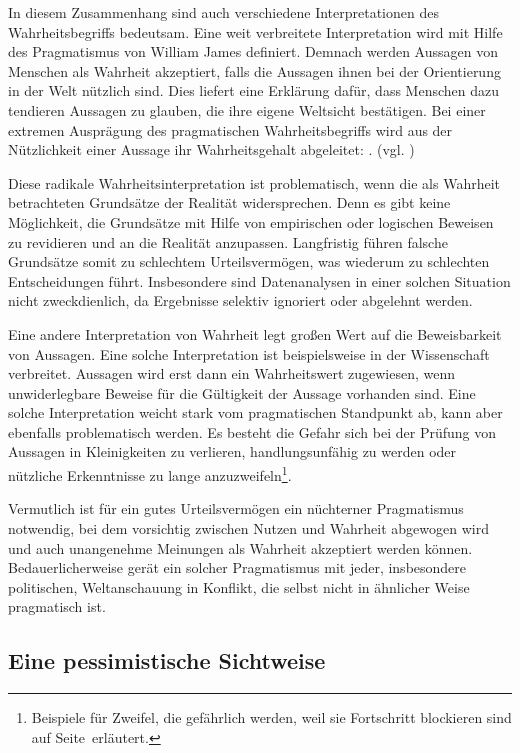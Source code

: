In diesem Zusammenhang sind auch verschiedene Interpretationen des
Wahrheitsbegriffs bedeutsam. Eine weit verbreitete Interpretation wird mit
Hilfe des Pragmatismus von William James definiert. Demnach werden
Aussagen von Menschen als Wahrheit akzeptiert, falls die Aussagen ihnen bei der
Orientierung in der Welt nützlich sind. Dies liefert eine Erklärung dafür, dass
Menschen dazu tendieren Aussagen zu glauben, die ihre eigene Weltsicht
bestätigen. Bei einer extremen Ausprägung des pragmatischen Wahrheitsbegriffs
wird aus der Nützlichkeit einer Aussage ihr Wahrheitsgehalt abgeleitet:
\grqq. (vgl. \cite{Precht})

Diese radikale Wahrheitsinterpretation ist problematisch, wenn die als Wahrheit
betrachteten Grundsätze der Realität widersprechen. Denn es gibt keine
Möglichkeit, die Grundsätze mit Hilfe von empirischen oder logischen Beweisen
zu revidieren und an die Realität anzupassen. Langfristig führen falsche
Grundsätze somit zu schlechtem Urteilsvermögen, was wiederum zu schlechten
Entscheidungen führt. Insbesondere sind Datenanalysen in einer solchen Situation
nicht zweckdienlich, da Ergebnisse selektiv ignoriert oder abgelehnt werden.

Eine andere Interpretation von Wahrheit legt großen Wert auf die Beweisbarkeit
von Aussagen. Eine solche Interpretation ist beispielsweise in der Wissenschaft
verbreitet. Aussagen wird erst dann ein Wahrheitswert zugewiesen, wenn
unwiderlegbare Beweise für die Gültigkeit der Aussage vorhanden sind. Eine
solche Interpretation weicht stark vom pragmatischen Standpunkt ab, kann aber
ebenfalls problematisch werden. Es besteht die Gefahr sich bei der Prüfung von
Aussagen in Kleinigkeiten zu verlieren, handlungsunfähig zu werden oder
nützliche Erkenntnisse zu lange anzuzweifeln\footnote{
Beispiele für Zweifel, die gefährlich werden, weil sie Fortschritt blockieren
sind auf Seite~\xcom erläutert.
}.

Vermutlich ist für ein gutes Urteilsvermögen ein nüchterner Pragmatismus
notwendig, bei dem vorsichtig zwischen Nutzen und Wahrheit abgewogen wird und
auch unangenehme Meinungen als Wahrheit akzeptiert werden können.
Bedauerlicherweise gerät ein solcher Pragmatismus mit jeder, insbesondere
politischen, Weltanschauung in Konflikt, die selbst nicht in ähnlicher Weise
pragmatisch ist.


\subsection{Eine pessimistische Sichtweise}

